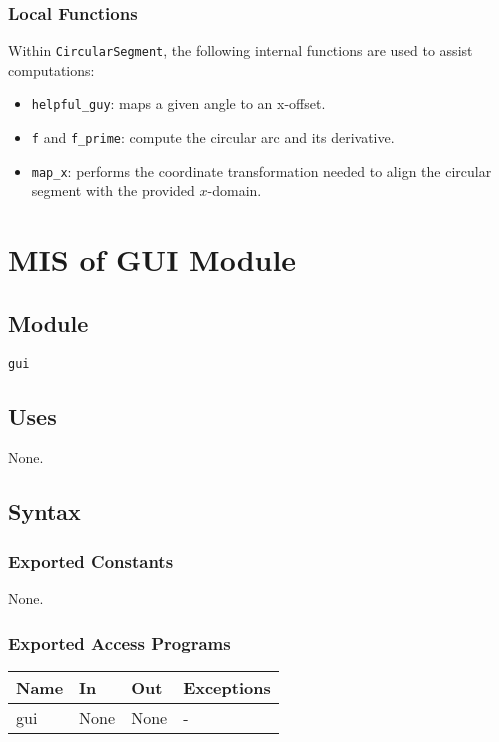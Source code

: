 \documentclass[12pt, titlepage]{article}
\begin{document}
\subsubsection{Local Functions}

Within \texttt{CircularSegment}, the following internal functions are used to assist computations:
\begin{itemize}
  \item \texttt{helpful\_guy}: maps a given angle to an x-offset.
  \item \texttt{f} and \texttt{f\_prime}: compute the circular arc and its derivative.
  \item \texttt{map\_x}: performs the coordinate transformation needed to align the circular segment with the provided \(x\)-domain.
\end{itemize}

\newpage

\section{MIS of GUI Module} \label{Module_GUI}

\subsection{Module}

\texttt{gui}

\subsection{Uses}

None.

\subsection{Syntax}

\subsubsection{Exported Constants}
None.

\subsubsection{Exported Access Programs}

\begin{center}
\begin{tabular}{p{2cm} p{4cm} p{4cm} p{2cm}}
\hline
\textbf{Name} & \textbf{In} & \textbf{Out} & \textbf{Exceptions} \\
\hline
gui & None & None & - \\
\hline
\end{tabular}
\end{center}
\end{document}
